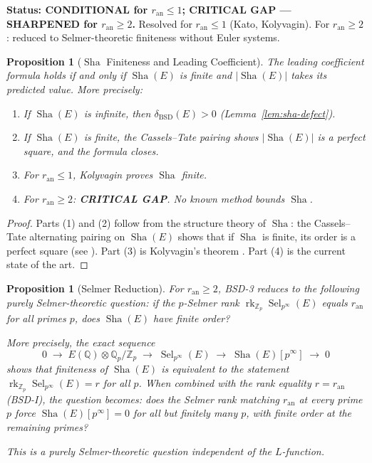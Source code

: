 \documentclass[11pt]{article}
\newtheorem{proposition}[theorem]{Proposition}
\DeclareMathOperator{\rk}{rk}
\DeclareMathOperator{\Sha}{Sha}
\DeclareMathOperator{\Sel}{Sel}
\begin{document}
\textbf{Status: CONDITIONAL for $r_{\mathrm{an}} \leq 1$; CRITICAL GAP --- SHARPENED for
$r_{\mathrm{an}} \geq 2$.}  Resolved for $r_{\mathrm{an}} \leq 1$
(Kato, Kolyvagin).  For $r_{\mathrm{an}} \geq 2$: reduced to Selmer-theoretic
finiteness without Euler systems.

\begin{proposition}[$\Sha$ Finiteness and Leading Coefficient]
\label{prop:bsd3}
The leading coefficient formula holds if and only if $\Sha(E)$ is finite and
$|\Sha(E)|$ takes its predicted value.  More precisely:
\begin{enumerate}
  \item If $\Sha(E)$ is infinite, then $\delta_{\mathrm{BSD}}(E) > 0$
    (Lemma~\ref{lem:sha-defect}).
  \item If $\Sha(E)$ is finite, the Cassels--Tate pairing shows
    $|\Sha(E)|$ is a perfect square, and the formula closes.
  \item For $r_{\mathrm{an}} \leq 1$, Kolyvagin \cite{Koly} proves $\Sha$
    finite.
  \item For $r_{\mathrm{an}} \geq 2$: \textbf{CRITICAL GAP}.  No known method
    bounds $\Sha$.
\end{enumerate}
\end{proposition}

\begin{proof}
Parts (1) and (2) follow from the structure theory of $\Sha$: the Cassels--Tate
alternating pairing on $\Sha(E)$ shows that if $\Sha$ is finite, its order is
a perfect square (see \cite{Cassels}).  Part (3) is Kolyvagin's theorem
\cite{Koly}.  Part (4) is the current state of the art.
\end{proof}

\begin{proposition}[Selmer Reduction]
\label{prop:selmer-reduction}
For $r_{\mathrm{an}} \geq 2$, BSD-3 reduces to the following purely
Selmer-theoretic question: if the $p$-Selmer rank
$\rk_{\mathbb{Z}_p} \Sel_{p^\infty}(E)$ equals $r_{\mathrm{an}}$ for all
primes $p$, does $\Sha(E)$ have finite order?

More precisely, the exact sequence
\[
  0 \;\to\; E(\mathbb{Q}) \otimes \mathbb{Q}_p / \mathbb{Z}_p
  \;\to\; \Sel_{p^\infty}(E)
  \;\to\; \Sha(E)[p^\infty]
  \;\to\; 0
\]
shows that finiteness of $\Sha(E)$ is equivalent to the statement
$\rk_{\mathbb{Z}_p} \Sel_{p^\infty}(E) = r$ for all $p$.  When combined
with the rank equality $r = r_{\mathrm{an}}$ (BSD-I), the question becomes:
does the Selmer rank matching $r_{\mathrm{an}}$ at every prime $p$ force
$\Sha(E)[p^\infty] = 0$ for all but finitely many $p$, with finite order at
the remaining primes?

This is a purely Selmer-theoretic question independent of the $L$-function.
\end{proposition}
\end{document}
